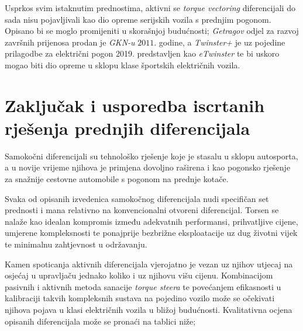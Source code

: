 \documentclass[11pt]{article}
\numberwithin{equation}{section}%
\begin{document}
Usprkos svim istaknutim prednostima, aktivni se \textit{torque vectoring} diferencijali do sada nisu pojavljivali kao dio opreme serijskih vozila s prednjim pogonom. Opisano bi se moglo promijeniti u skorašnjoj budućnosti; \textit{Getragov} odjel za razvoj završnih prijenosa prodan je \textit{GKN-u} $2011.$ godine, a \textit{Twinster+} je uz pojedine prilagodbe za električni pogon 2019. predstavljen kao \textit{eTwinster} te bi uskoro mogao biti dio opreme u sklopu klase športskih električnih vozila.

\section{Zaključak i usporedba iscrtanih rješenja prednjih diferencijala}

Samokočni diferencijali su tehnološko rješenje koje je stasalu u sklopu autosporta, a u novije vrijeme njihova je primjena dovoljno raširena i kao pogonsko rješenje za snažnije cestovne automobile s pogonom na prednje kotače. 

Svaka od opisanih izvedenica samokočnog diferencijala nudi specifičan set prednosti i mana relativno na konvencionalni otvoreni diferencijal. Torsen se nalaže kao idealan kompromis između adekvatnih performansi, prihvatljive cijene, umjerene kompleksnosti te ponajprije bezbrižne eksploatacije uz dug životni vijek te minimalnu zahtjevnost u održavanju. 

Kamen spoticanja aktivnih diferencijala vjerojatno je vezan uz njihov utjecaj na osjećaj u upravljaču jednako koliko i uz njihovu višu cijenu. Kombinacijom pasivnih i aktivnih metoda sanacije \textit{torque steera} te povećanjem efikasnosti u kalibraciji takvih kompleksnih sustava na pojedino vozilo može se očekivati njihova pojava u klasi električnih vozila u bližoj budućnosti. Kvalitativna ocjena opisanih diferencijala može se pronaći na tablici niže;
\end{document}
